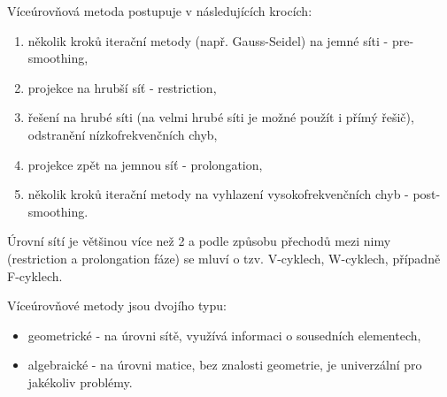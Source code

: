 \documentclass[a4paper,12pt]{report}
\theoremstyle{remark}
\begin{document}
Víceúrovňová metoda postupuje v následujících krocích:
\begin{enumerate}
	\item několik kroků iterační metody (např. Gauss-Seidel) na jemné síti - pre-smoothing,
	\item projekce na hrubší síť - restriction,
	\item řešení na hrubé síti (na velmi hrubé síti je možné použít i přímý řešič), odstranění nízkofrekvenčních chyb,
	\item projekce zpět na jemnou síť - prolongation,
	\item několik kroků iterační metody na vyhlazení vysokofrekvenčních chyb - post-smoothing.
\end{enumerate}

Úrovní sítí je většinou více než 2 a podle způsobu přechodů mezi nimy (restriction a prolongation fáze) se mluví o tzv. V-cyklech, W-cyklech, případně F-cyklech. 

Víceúrovňové metody jsou dvojího typu:
\begin{itemize}
	\item geometrické - na úrovni sítě, využívá informaci o sousedních elementech,
	\item algebraické - na úrovni matice, bez znalosti geometrie, je univerzální pro jakékoliv problémy.
\end{itemize}
	

	
		
\end{document}
